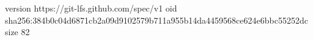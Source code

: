 version https://git-lfs.github.com/spec/v1
oid sha256:384b0c04d6871cb2a09d9102579b711a955b14da4459568ce624e6bbc55252dc
size 82
